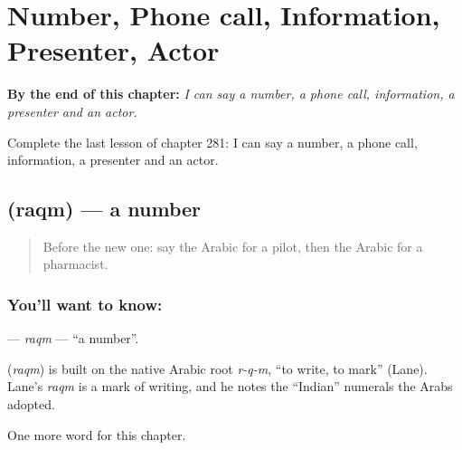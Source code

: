 
\chapter{Number, Phone call, Information, Presenter, Actor}
\label{ch:ar-number-phone-call-information-presenter-actor}

\begin{chapteropening}
\textbf{By the end of this chapter:} \emph{I can say a number, a phone call, information, a presenter and an actor.}

Complete the last lesson of chapter 281: I can say a number, a phone call, information, a presenter and an actor.
\end{chapteropening}

\section[\texorpdfstring{\ar{رقم} (raqm)}{رقم (raqm)}]{ (raqm) — a number}

\label{lesson:AR-C281-raqm}



\begin{quote}
Before the new one: say the Arabic for a pilot, then the Arabic for a pharmacist.
\end{quote}

\subsection*{You'll want to know: }
\textbf{} — \emph{raqm} — \textquotedblleft{}a number\textquotedblright{}.

\begin{cousinweb}
\textbf{} (\emph{raqm}) is built on the native Arabic root \emph{r-q-m}, \textquotedblleft{}to write, to mark\textquotedblright{} (Lane). Lane's \emph{raqm} is a mark of writing, and he notes the \textquotedblleft{}Indian\textquotedblright{} numerals the Arabs adopted.
\end{cousinweb}

\begin{grammarlens}[title={What you've built}]
One more word for this chapter.
\end{grammarlens}

